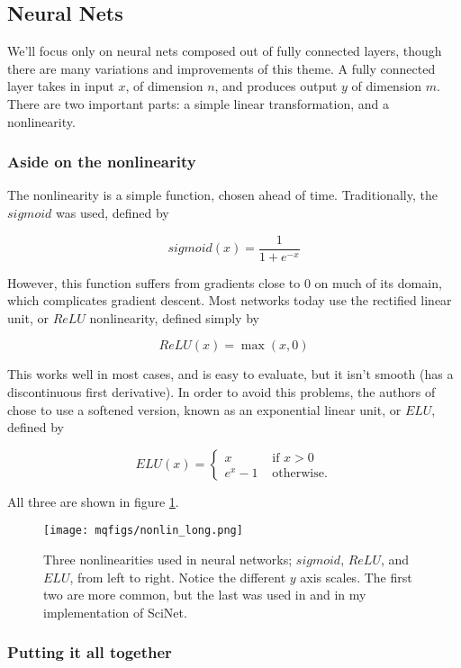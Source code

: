 \documentclass[aps,prl,preprint,groupedaddress]{revtex4-1}
\begin{document}
\subsection{ Neural Nets}

We'll focus only on neural nets composed out of fully connected layers, though there are many variations and improvements of this theme. A fully connected layer takes in input $x$, of dimension $n$, and produces output $y$ of dimension $m$. There are two important parts: a simple linear transformation, and a nonlinearity.

\subsubsection{ Aside on the nonlinearity}

The nonlinearity is a simple function, chosen ahead of time. Traditionally, the $sigmoid$ was used, defined by 

$$ sigmoid(x) = \frac{1}{1 + e^{-x}}$$

However, this function suffers from gradients close to $0$ on much of its domain, which complicates gradient descent. Most networks today use the rectified linear unit, or $ReLU$ nonlinearity, defined simply by 

$$ ReLU(x) = \max (x, 0) $$

This works well in most cases, and is easy to evaluate, but it isn't smooth (has a discontinuous first derivative). In order to avoid this problems, the authors of \cite{iten2020} chose to use a softened version, known as an exponential linear unit, or $ELU$, defined by 

$$ ELU(x) =  \left\{  \begin{align*} x & \text{ if } x > 0 \\ e^x - 1 &  \text{ otherwise.} \end{align*} \right.$$

All three are shown in figure \ref{allnonlin}.

\begin{figure}[h]
   \centering
   \texttt{[image: mqfigs/nonlin\_long.png]}
   \caption{\label{allnonlin} Three nonlinearities used in neural networks; $sigmoid$, $ReLU$, and $ELU$, from left to right. Notice the different $y$ axis scales. The first two are more common, but the last was used in \cite{iten2020} and in my implementation of SciNet.}
\end{figure}

\subsubsection{ Putting it all together}
\end{document}
